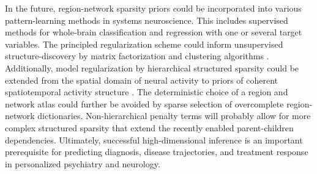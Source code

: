 \documentclass{article}
\begin{document}
In the future,
region-network sparsity priors could be incorporated into various
pattern-learning methods in systems neuroscience.
%
This includes supervised methods for whole-brain classification and regression
with one or several target variables.
The principled regularization scheme could inform
unsupervised structure-discovery by
matrix factorization and clustering algorithms
\cite{jenatton2009structured, witten2010framework}.
Additionally,
model regularization by hierarchical structured sparsity could be extended
from the spatial domain of neural activity to
priors of coherent spatiotemporal activity structure
\cite{gramfort2011tracking}.
%
The deterministic choice of a region and network atlas
could further be avoided by
sparse selection of overcomplete region-network dictionaries.
Non-hierarchical penalty terms will probably allow for
more complex structured sparsity that
extend the recently enabled parent-children dependencies.
%
Ultimately,
successful high-dimensional inference is
an important prerequisite
for predicting diagnosis,
disease trajectories, and treatment response
in personalized psychiatry and neurology.




  
\small
% 


% 
\end{document}
